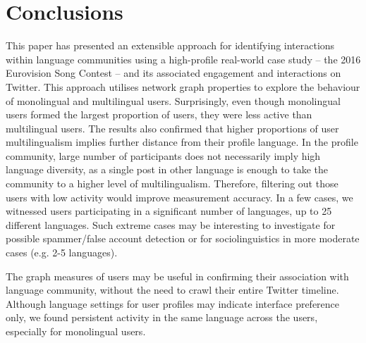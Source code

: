 \documentclass{llncs}
\begin{document}
\section{Conclusions}\label{conclusions}

This paper has presented an extensible approach for identifying
interactions within language communities using a high-profile
real-world case study -- the 2016 Eurovision Song Contest -- and its
associated engagement and interactions on Twitter. This approach
utilises network graph properties to explore the behaviour of
monolingual and multilingual users. Surprisingly, even though
monolingual users formed the largest proportion of users, they were
less active than multilingual users.  The results also confirmed that
higher proportions of user multilingualism implies further distance
from their profile language.  In the profile community, large number
of participants does not necessarily imply high language diversity, as
a single post in other language is enough to take the community to a
higher level of multilingualism.  Therefore, filtering out those users
with low activity would improve measurement accuracy. In a few cases,
we witnessed users participating in a significant number of languages,
up to 25 different languages. Such extreme cases may be interesting to
investigate for possible spammer/false account detection or for
sociolinguistics in more moderate cases (e.g. 2-5 languages).

The graph measures of users may be useful in confirming their
association with language community, without the need to crawl their
entire Twitter timeline.  Although language settings for user profiles
may indicate interface preference only, we found persistent activity
in the same language across the users, especially for monolingual
users.


\end{document}
